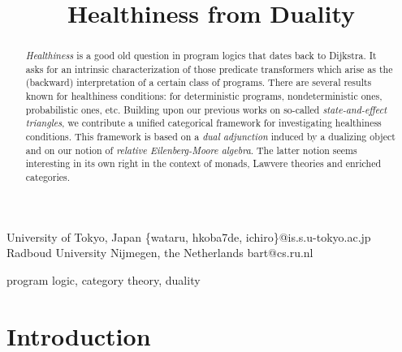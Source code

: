 \documentclass[9pt, preprint]{sigplanconf}
\theoremstyle{theorem}
\theoremstyle{definition}
\begin{document}
\setlength{\pdfpageheight}{\paperheight}
\setlength{\pdfpagewidth}{\paperwidth}








\titlebanner{}        \preprintfooter{}   

\title{Healthiness from Duality}


           {University of Tokyo, Japan}
           {\{wataru, hkoba7de, ichiro\}@is.s.u-tokyo.ac.jp}
           {Radboud University Nijmegen, the Netherlands}
           {bart@cs.ru.nl}

\maketitle

\begin{abstract}
  \emph{Healthiness} is a good old question in program logics that
  dates back to Dijkstra. It asks for an intrinsic characterization of
  those predicate transformers which arise as the (backward)
  interpretation of a certain class of programs. There are several
  results known for healthiness conditions: for deterministic
  programs, nondeterministic ones, probabilistic ones, etc.  Building
  upon our previous works on so-called \emph{state-and-effect
    triangles}, we contribute a unified categorical framework for
  investigating healthiness conditions. This framework is based on a
  \emph{dual adjunction} induced by a dualizing object and on our
  notion of \emph{relative Eilenberg-Moore algebra}.  The latter
  notion seems interesting in its own right in the context of monads,
  Lawvere theories and enriched categories.
\end{abstract}





\keywords
program logic, category theory, duality




\section{Introduction}\label{sec:intro}
\end{document}
